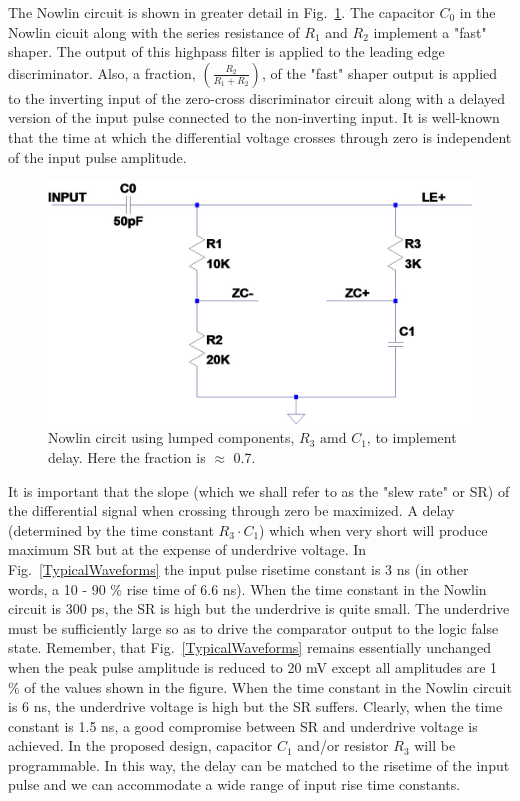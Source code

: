 \documentclass[12pt, onecolumn]{IEEEtran}
\begin{document}
\noindent
The Nowlin circuit is shown in greater detail in Fig.~\ref{Nowlin}.  The capacitor $C_0$ in the Nowlin cicuit along with the series resistance of $R_1$ and $R_2$ implement a "fast" shaper.  The output of this highpass filter is applied to the leading edge discriminator. Also, a fraction, $(\frac{R_2}{R_1 + R_2})$, of the "fast" shaper output is applied to the inverting input of the zero-cross discriminator circuit along with a delayed version of the input pulse connected to the non-inverting input. It is well-known that the time at which the differential voltage crosses through zero is independent of the input pulse amplitude.\\

\begin{figure}[htbp!]
	\centering
 	\includegraphics[scale=0.3,keepaspectratio=true]{./images/nowlin.jpg}
 	\caption{Nowlin circit using lumped components, $R_3 \text{ amd } C_1$, to implement delay. Here the fraction is $\approx$ 0.7.}
 	\label{Nowlin}
\end{figure}

\noindent
It is important that the slope (which we shall refer to as the "slew rate" or SR) of the differential signal when crossing through zero be maximized.  A delay (determined by the time constant $R_3 \cdot C_1$) which when very short will produce maximum SR but at the expense of underdrive voltage. In Fig.~\ref{TypicalWaveforms} the input pulse risetime constant is 3 ns (in other words,  a 10 - 90 \% rise time of 6.6 ns).  When the time constant in the Nowlin circuit is 300 ps, the SR is high but the underdrive is quite small. The underdrive must be sufficiently large so as to drive the comparator output to the logic false state.  Remember, that Fig.~\ref{TypicalWaveforms} remains essentially unchanged when the peak pulse amplitude is reduced to 20 mV except all amplitudes are 1 \% of the values shown in the figure. When the time constant in the Nowlin circuit is 6 ns, the underdrive voltage is high but the SR suffers. Clearly, when the time constant is 1.5 ns, a good compromise between SR and underdrive voltage is achieved. In the proposed design, capacitor $C_1$ and/or resistor $R_3$ will be programmable. In this way, the delay can be matched to the risetime of the input pulse and we can accommodate a wide range of input rise time constants. \\
\end{document}
